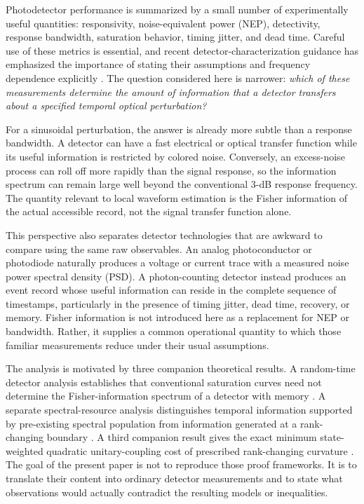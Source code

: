 \documentclass[aps,pra,reprint,superscriptaddress,longbibliography]{revtex4-2}
\begin{document}
Photodetector performance is summarized by a small number of experimentally useful quantities: responsivity, noise-equivalent power (NEP), detectivity, response bandwidth, saturation behavior, timing jitter, and dead time. Careful use of these metrics is essential, and recent detector-characterization guidance has emphasized the importance of stating their assumptions and frequency dependence explicitly \cite{PecuniaEtAl2025}. The question considered here is narrower: \emph{which of these measurements determine the amount of information that a detector transfers about a specified temporal optical perturbation?}

For a sinusoidal perturbation, the answer is already more subtle than a response bandwidth. A detector can have a fast electrical or optical transfer function while its useful information is restricted by colored noise. Conversely, an excess-noise process can roll off more rapidly than the signal response, so the information spectrum can remain large well beyond the conventional $3$-dB response frequency. The quantity relevant to local waveform estimation is the Fisher information of the actual accessible record, not the signal transfer function alone.

This perspective also separates detector technologies that are awkward to compare using the same raw observables. An analog photoconductor or photodiode naturally produces a voltage or current trace with a measured noise power spectral density (PSD). A photon-counting detector instead produces an event record whose useful information can reside in the complete sequence of timestamps, particularly in the presence of timing jitter, dead time, recovery, or memory. Fisher information is not introduced here as a replacement for NEP or bandwidth. Rather, it supplies a common operational quantity to which those familiar measurements reduce under their usual assumptions.

The analysis is motivated by three companion theoretical results. A random-time detector analysis establishes that conventional saturation curves need not determine the Fisher-information spectrum of a detector with memory \cite{CompanionMemory2026}. A separate spectral-resource analysis distinguishes temporal information supported by pre-existing spectral population from information generated at a rank-changing boundary \cite{CompanionTwoRegimes2026}. A third companion result gives the exact minimum state-weighted quadratic unitary-coupling cost of prescribed rank-changing curvature \cite{CompanionUnitaryCost2026}. The goal of the present paper is not to reproduce those proof frameworks. It is to translate their content into ordinary detector measurements and to state what observations would actually contradict the resulting models or inequalities.
\end{document}
